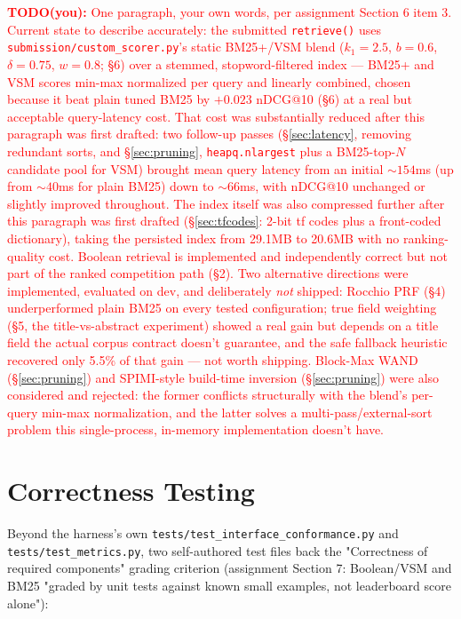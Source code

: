 \documentclass[11pt]{article}
\newcommand{\todo}[1]{\textcolor{red}{\textbf{TODO(you):} #1}}
\begin{document}
\todo{One paragraph, your own words, per assignment Section 6 item 3.
Current state to describe accurately: the submitted \texttt{retrieve()}
uses \texttt{submission/custom\_scorer.py}'s static BM25+/VSM blend
($k_1{=}2.5$, $b{=}0.6$, $\delta{=}0.75$, $w{=}0.8$; \S 6) over a
stemmed, stopword-filtered index --- BM25+ and VSM scores min-max
normalized per query and linearly combined, chosen because it beat plain
tuned BM25 by $+0.023$ nDCG@10 (\S 6) at a real but acceptable
query-latency cost. That cost was substantially reduced after this
paragraph was first drafted: two follow-up passes
(\S\ref{sec:latency}, removing redundant sorts, and
\S\ref{sec:pruning}, \texttt{heapq.nlargest} plus a BM25-top-$N$
candidate pool for VSM) brought mean query latency from an initial
${\sim}154$ms (up from ${\sim}40$ms for plain BM25) down to
${\sim}66$ms, with nDCG@10 unchanged or slightly improved throughout.
The index itself was also compressed further after this paragraph was
first drafted (\S\ref{sec:tfcodes}: 2-bit tf codes plus a front-coded
dictionary), taking the persisted index from 29.1MB to 20.6MB with no
ranking-quality cost. Boolean retrieval is
implemented and independently correct but not part of the ranked
competition path (\S 2). Two alternative directions were implemented,
evaluated on dev, and deliberately \emph{not} shipped: Rocchio PRF
(\S 4) underperformed plain BM25 on every tested configuration; true
field weighting (\S 5, the title-vs-abstract experiment) showed a real
gain but depends on a title field the actual
corpus contract doesn't guarantee, and the safe fallback heuristic
recovered only 5.5\% of that gain --- not worth shipping. Block-Max WAND
(\S\ref{sec:pruning}) and SPIMI-style build-time inversion
(\S\ref{sec:pruning}) were also considered and rejected: the former
conflicts structurally with the blend's per-query min-max normalization,
and the latter solves a multi-pass/external-sort problem this
single-process, in-memory implementation doesn't have.}

\section{Correctness Testing}

Beyond the harness's own \texttt{tests/test\_interface\_conformance.py}
and \texttt{tests/test\_metrics.py}, two self-authored test files back
the "Correctness of required components" grading criterion
(assignment Section 7: Boolean/VSM and BM25 "graded by unit tests
against known small examples, not leaderboard score alone"):
\end{document}
